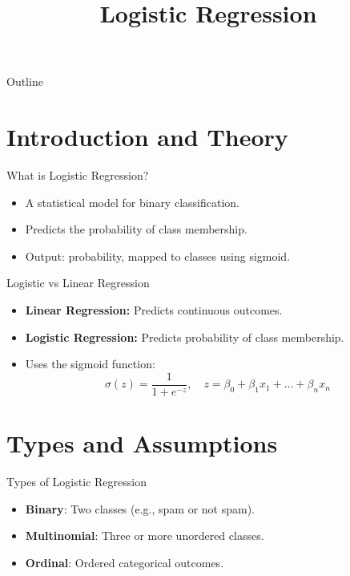 \documentclass{beamer}
\title{Logistic Regression}
\subtitle{}
\date{}
\begin{document}
{
\begin{frame}
    \titlepage
\end{frame}
}

\begin{frame}{Outline}
    \tableofcontents
\end{frame}



\section{Introduction and Theory}

\begin{frame}{What is Logistic Regression?}
\begin{itemize}
  \item A statistical model for binary classification.
  \item Predicts the probability of class membership.
  \item Output: probability, mapped to classes using sigmoid.
\end{itemize}
\end{frame}

\begin{frame}{Logistic vs Linear Regression}
\begin{itemize}
  \item \textbf{Linear Regression:} Predicts continuous outcomes.
  \item \textbf{Logistic Regression:} Predicts probability of class membership.
  \item Uses the sigmoid function:
  \[
  \sigma(z) = \frac{1}{1 + e^{-z}}, \quad z = \beta_0 + \beta_1 x_1 + \dots + \beta_n x_n
  \]
\end{itemize}
\end{frame}

\section{Types and Assumptions}

\begin{frame}{Types of Logistic Regression}
\begin{itemize}
  \item \textbf{Binary}: Two classes (e.g., spam or not spam).
  \item \textbf{Multinomial}: Three or more unordered classes.
  \item \textbf{Ordinal}: Ordered categorical outcomes.
\end{itemize}
\end{frame}
\end{document}
